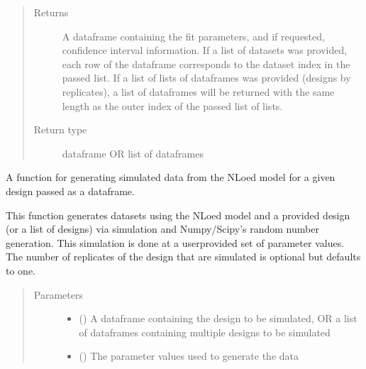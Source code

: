 \documentclass[letterpaper,10pt,english,openany,oneside]{sphinxmanual}
\begin{document}
\begin{fulllineitems}
\begin{fulllineitems}
\begin{quote}
\begin{description}
\item[{Returns}] \leavevmode
A dataframe containing the fit parameters,
and if requested, confidence interval information. If a list of datasets was provided,
each row of the dataframe corresponds to the dataset index in the passed list.
If a list of lists of dataframes was provided (designs by replicates),
a list of dataframes will be returned with the same length as the outer index of the
passed list of lists.

\item[{Return type}] \leavevmode
dataframe OR list of dataframes

\end{description}\end{quote}

\end{fulllineitems}


\begin{fulllineitems}
\label{\detokenize{nloed:nloed.model.Model.sample}}
A function for generating simulated data from the NLoed model for a given design passed
as a dataframe.

This function generates datasets using the NLoed model and a provided design (or a list of
designs) via simulation and Numpy/Scipy’s random number generation. This simulation is done
at a user\sphinxhyphen{}provided set of parameter values. The number of replicates of the design that are
simulated is optional but defaults to one.
\begin{quote}\begin{description}
\item[{Parameters}] \leavevmode\begin{itemize}
\item {} 
 () \textendash{} A dataframe containing the design to be simulated,
OR a list of dataframes containing multiple designs to be simulated

\item {} 
 (\sphinxstyleliteralemphasis{\sphinxupquote{, }}) \textendash{} The parameter values used to generate the data


\end{itemize}
\end{description}
\end{quote}
\end{fulllineitems}
\end{fulllineitems}
\end{document}
